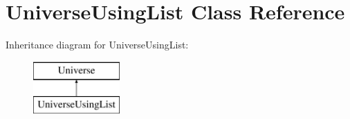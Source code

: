 \hypertarget{class_universe_using_list}{}\section{Universe\+Using\+List Class Reference}
\label{class_universe_using_list}
Inheritance diagram for Universe\+Using\+List\+:\begin{figure}[H]
\begin{center}
\leavevmode
\includegraphics[height=2.000000cm]{class_universe_using_list}
\end{center}
\end{figure}
